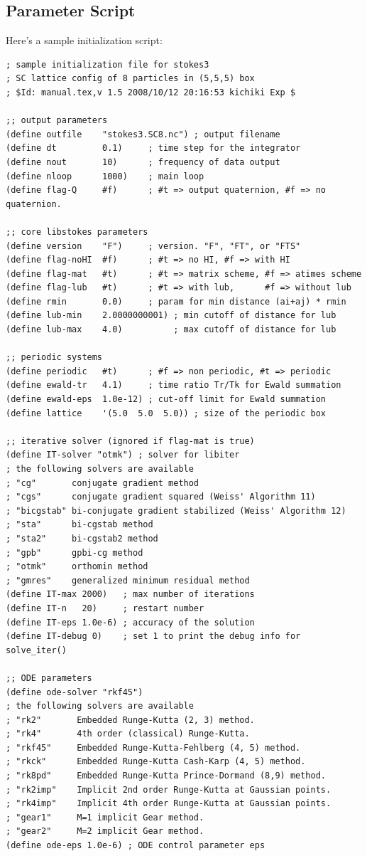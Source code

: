 \documentclass{book}
\begin{document}
\subsection{Parameter Script}
Here's a sample initialization script:
{\small
\begin{verbatim}
; sample initialization file for stokes3
; SC lattice config of 8 particles in (5,5,5) box
; $Id: manual.tex,v 1.5 2008/10/12 20:16:53 kichiki Exp $

;; output parameters
(define outfile    "stokes3.SC8.nc") ; output filename
(define dt         0.1)     ; time step for the integrator
(define nout       10)      ; frequency of data output
(define nloop      1000)    ; main loop
(define flag-Q     #f)      ; #t => output quaternion, #f => no quaternion.

;; core libstokes parameters
(define version    "F")     ; version. "F", "FT", or "FTS"
(define flag-noHI  #f)      ; #t => no HI, #f => with HI
(define flag-mat   #t)      ; #t => matrix scheme, #f => atimes scheme
(define flag-lub   #t)      ; #t => with lub,      #f => without lub
(define rmin       0.0)     ; param for min distance (ai+aj) * rmin
(define lub-min    2.0000000001) ; min cutoff of distance for lub
(define lub-max    4.0)          ; max cutoff of distance for lub

;; periodic systems
(define periodic   #t)      ; #f => non periodic, #t => periodic
(define ewald-tr   4.1)     ; time ratio Tr/Tk for Ewald summation
(define ewald-eps  1.0e-12) ; cut-off limit for Ewald summation
(define lattice    '(5.0  5.0  5.0)) ; size of the periodic box

;; iterative solver (ignored if flag-mat is true)
(define IT-solver "otmk") ; solver for libiter
; the following solvers are available
; "cg"       conjugate gradient method
; "cgs"      conjugate gradient squared (Weiss' Algorithm 11)
; "bicgstab" bi-conjugate gradient stabilized (Weiss' Algorithm 12)
; "sta"      bi-cgstab method
; "sta2"     bi-cgstab2 method
; "gpb"      gpbi-cg method
; "otmk"     orthomin method
; "gmres"    generalized minimum residual method
(define IT-max 2000)   ; max number of iterations
(define IT-n   20)     ; restart number
(define IT-eps 1.0e-6) ; accuracy of the solution
(define IT-debug 0)    ; set 1 to print the debug info for solve_iter()

;; ODE parameters
(define ode-solver "rkf45")
; the following solvers are available
; "rk2"       Embedded Runge-Kutta (2, 3) method.
; "rk4"       4th order (classical) Runge-Kutta.
; "rkf45"     Embedded Runge-Kutta-Fehlberg (4, 5) method.
; "rkck"      Embedded Runge-Kutta Cash-Karp (4, 5) method.
; "rk8pd"     Embedded Runge-Kutta Prince-Dormand (8,9) method.
; "rk2imp"    Implicit 2nd order Runge-Kutta at Gaussian points.
; "rk4imp"    Implicit 4th order Runge-Kutta at Gaussian points.
; "gear1"     M=1 implicit Gear method.
; "gear2"     M=2 implicit Gear method.
(define ode-eps 1.0e-6) ; ODE control parameter eps


\end{verbatim}}
\end{document}
